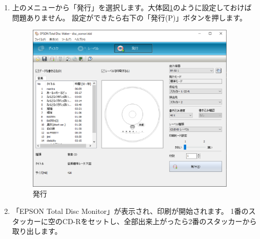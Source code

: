 \documentclass[11pt,a4paper]{jsarticle}
\begin{document}
\begin{enumerate}
                        \item 上のメニューから「発行」を選択します。大体図\ref{fig:pp5004}のように設定しておけば問題ありません。
                            設定ができたら右下の「発行(P)」ボタンを押します。
                        \begin{figure}[H]
                            \begin{center}
                            \includegraphics[width=10.0cm]{./image/pp5004.eps}
                            \caption{発行}
                            \label{fig:pp5004}
                            \end{center}
                        \end{figure}

                        \item 「EPSON Total Disc Monitor」が表示され、印刷が開始されます。
                        1番のスタッカーに空のCD-Rをセットし、全部出来上がったら2番のスタッカーから取り出します。
                            

\end{enumerate}
\end{document}
